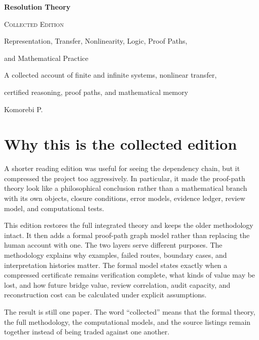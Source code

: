 \documentclass[11pt,oneside]{book}
\theoremstyle{remark}
\begin{document}
\begin{titlepage}
\centering
\vspace*{.8in}
{\Huge\bfseries Resolution Theory\par}
\vspace{.10in}
{\Large\scshape Collected Edition\par}
\vspace{.22in}
{\Large Representation, Transfer, Nonlinearity, Logic, Proof Paths,\par}
{\Large and Mathematical Practice\par}
\vspace{.35in}
{\large A collected account of finite and infinite systems, nonlinear transfer,\par}
{\large certified reasoning, proof paths, and mathematical memory\par}
\vfill
{\Large Komorebi P.\par}
\vspace{.7in}
\end{titlepage}

\frontmatter
\chapter*{Why this is the collected edition}
A shorter reading edition was useful for seeing the dependency chain, but it compressed the project too aggressively.  In particular, it made the proof-path theory look like a philosophical conclusion rather than a mathematical branch with its own objects, closure conditions, error models, evidence ledger, review model, and computational tests.

This edition restores the full integrated theory and keeps the older methodology intact.  It then adds a formal proof-path graph model rather than replacing the human account with one.  The two layers serve different purposes.  The methodology explains why examples, failed routes, boundary cases, and interpretation histories matter.  The formal model states exactly when a compressed certificate remains verification complete, what kinds of value may be lost, and how future bridge value, review correlation, audit capacity, and reconstruction cost can be calculated under explicit assumptions.

The result is still one paper.  The word ``collected'' means that the formal theory, the full methodology, the computational models, and the source listings remain together instead of being traded against one another.
\end{document}
